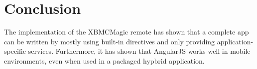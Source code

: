 \section{Conclusion}

The implementation of the XBMCMagic remote has shown that a complete app can be written by mostly using built-in directives and only providing application-specific services. Furthermore, it has shown that AngularJS works well in mobile environments, even when used in a packaged hypbrid application.